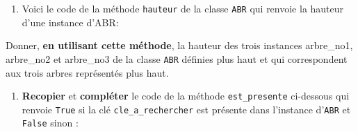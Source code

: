 \begin{Shaded}
\begin{Highlighting}[]
\OperatorTok{=}
\OperatorTok{=}
\OperatorTok{=}
 \NormalTok{ [..., ..., ..., ..., ..., ..., ...]:}
 \NormalTok{ [..., ..., ..., ..., ..., ..., ...]:}
 \NormalTok{ [..., ..., ..., ..., ..., ..., ...]:}
\end{Highlighting}
\end{Shaded}

\begin{enumerate}
\def\labelenumi{\arabic{enumi}.}
\setcounter{enumi}{5}
\tightlist
\item
  Voici le code de la méthode \texttt{hauteur} de la classe \texttt{ABR}
  qui renvoie la hauteur d'une instance d'ABR:
\end{enumerate}

\begin{Shaded}
\begin{Highlighting}[]
 \NormalTok{):}
    
        \OperatorTok{{-}}
   \NormalTok{ :}
         \OperatorTok{+} \NormalTok{(}
                       
\end{Highlighting}
\end{Shaded}

Donner, \textbf{en utilisant cette méthode}, la hauteur des trois
instances arbre\_no1, arbre\_no2 et arbre\_no3 de la classe \texttt{ABR}
définies plus haut et qui correspondent aux trois arbres représentés
plus haut.

\begin{enumerate}
\def\labelenumi{\arabic{enumi}.}
\setcounter{enumi}{6}
\tightlist
\item
  \textbf{Recopier} et \textbf{compléter} le code de la méthode
  \texttt{est\_presente} ci-dessous qui renvoie \texttt{True} si la clé
  \texttt{cle\_a\_rechercher} est présente dans l'instance
  d'\texttt{ABR} et \texttt{False} sinon :
\end{enumerate}

